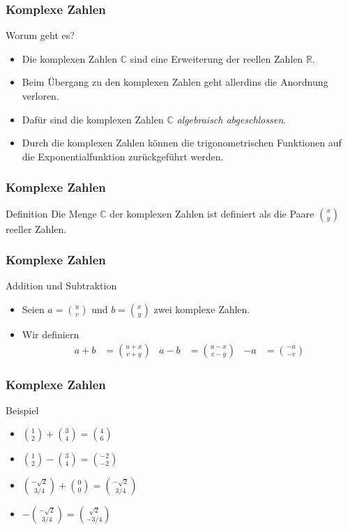 \documentclass{beamer}
\title[Annuma]{\mytitle}
\author[Amin Coja-Oghlan]{Amin Coja-Oghlan}
\institute[Frankfurt]{JWGUFFM}
\date{}
\renewcommand{\emph}[1]{{\textcolor{solarizedRed}{\itshape #1}}}
\newcommand\RR{\mathbb R}
\newcommand\CC{\mathbb C}
\renewcommand{\oe}{\"o}
\newcommand{\ue}{\"u}
\newcommand{\Ue}{\"U}
\newcommand{\mytitle}{Komplexe Zahlen}
\begin{document}
\frame[plain]{\titlepage}

\begin{frame}\frametitle{\mytitle}
	\begin{block}{Worum geht es?}
		\begin{itemize}
			\item Die komplexen Zahlen $\CC$ sind eine Erweiterung der reellen Zahlen $\RR$.
			\item Beim \Ue bergang zu den komplexen Zahlen geht allerdins die Anordnung verloren.
			\item Daf\ue r sind die komplexen Zahlen $\CC$ \emph{algebraisch abgeschlossen}.
			\item Durch die komplexen Zahlen k\oe nnen die trigonometrischen Funktionen auf die Exponentialfunktion zur\ue ckgef\ue hrt werden.
		\end{itemize}
	\end{block}
\end{frame}

\begin{frame}\frametitle{\mytitle}
	\begin{block}{Definition}
			Die Menge $\CC$ der komplexen Zahlen ist definiert als die Paare $\binom xy$ reeller Zahlen.
	\end{block}
\end{frame}

\begin{frame}\frametitle{\mytitle}
	\begin{block}{Addition und Subtraktion}
			\begin{itemize}
				\item Seien $a=\binom uv$ und $b=\binom xy$ zwei komplexe Zahlen.
			\item Wir definiern
				\begin{align*}
					a+b&=\binom{u+x}{v+y}&
					a-b&=\binom{u-x}{v-y}&
					-a&=\binom{-u}{-v}
				\end{align*}
			\end{itemize}
	\end{block}
\end{frame}

\begin{frame}\frametitle{\mytitle}
	\begin{block}{Beispiel}
			\begin{itemize}
				\item $\binom{1}2+\binom34=\binom46$
				\item $\binom12-\binom34=\binom{-2}{-2}$
				\item $\binom{-\sqrt 2}{3/4}+\binom00=\binom{-\sqrt2}{3/4}$
				\item $-\binom{-\sqrt 2}{3/4}=\binom{\sqrt2}{-3/4}$
			\end{itemize}
	\end{block}
\end{frame}
\end{document}
